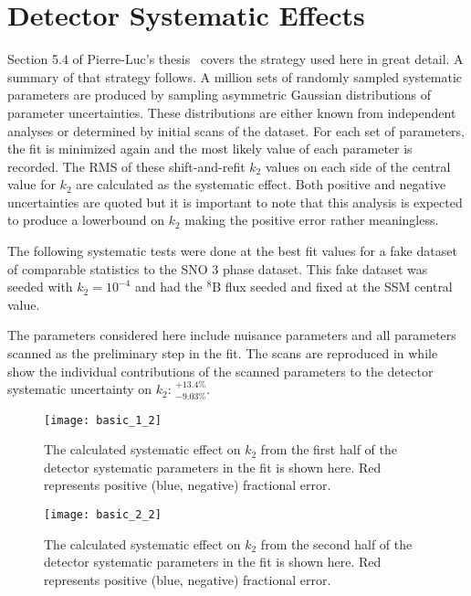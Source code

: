 \clearpage 

\section{Detector Systematic Effects}
\label{systematics} 

Section 5.4 of Pierre-Luc's thesis~\cite{plthesis} covers the strategy used here in great detail. 
A summary of that strategy follows. A million sets of randomly sampled systematic parameters are produced by sampling asymmetric Gaussian distributions of parameter uncertainties. These distributions are either known from independent analyses or determined by initial scans of the dataset. For each set of parameters, the fit is minimized again and the most likely value of each parameter is recorded. The RMS of these shift-and-refit $k_2$ values on each side of the central value for $k_2$ are calculated as the systematic effect. Both positive and negative uncertainties are quoted but it is important to note that this analysis is expected to produce a lowerbound on $k_2$ making the positive error rather meaningless.

The following systematic tests were done at the best fit values for a fake dataset of comparable statistics to the SNO 3 phase dataset. This fake dataset was seeded with $k_2 = 10^{-4}$ and had the $^8$B flux seeded and fixed at the SSM central value.

The parameters considered here include nuisance parameters and all parameters scanned as the preliminary step in the fit. The scans are reproduced in  while  show the individual contributions of the scanned parameters to the detector systematic uncertainty on $k_2$: $^{+13.4\%}_{-9.03\%}$.

\begin{figure}
\centering
\texttt{[image: basic\_1\_2]}
\caption{The calculated systematic effect on $k_2$ from the first half of the detector systematic parameters in the fit is shown here. Red represents positive (blue, negative) fractional error.}
\label{fig:detector_systematics1}
\end{figure}

\begin{figure}
\centering
\texttt{[image: basic\_2\_2]}
\caption{The calculated systematic effect on $k_2$ from the second half of the detector systematic parameters in the fit is shown here. Red represents positive (blue, negative) fractional error.}
\label{fig:detector_systematics2}
\end{figure}


